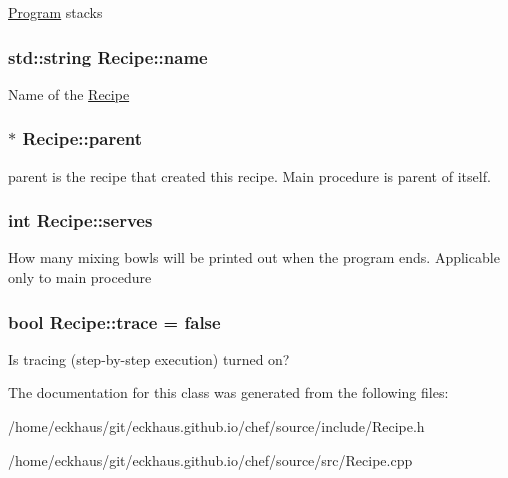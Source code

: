 \hyperlink{classProgram}{Program} stacks \hypertarget{classRecipe_a50091cc91548be3bf3399bd0471667f1}{
\subsubsection[{name}]{\setlength{\rightskip}{0pt plus 5cm}std\-::string Recipe\-::name}}\label{classRecipe_a50091cc91548be3bf3399bd0471667f1}
Name of the \hyperlink{classRecipe}{Recipe} \hypertarget{classRecipe_aa0ee8a8dbfef781def252e579bfbc209}{
\subsubsection[{parent}]{$\ast$ Recipe\-::parent}}\label{classRecipe_aa0ee8a8dbfef781def252e579bfbc209}
parent is the recipe that created this recipe. Main procedure is parent of itself. \hypertarget{classRecipe_a265d7fcca7983c4900e76eb10959c9c2}{
\subsubsection[{serves}]{\setlength{\rightskip}{0pt plus 5cm}int Recipe\-::serves}}\label{classRecipe_a265d7fcca7983c4900e76eb10959c9c2}
How many mixing bowls will be printed out when the program ends. Applicable only to main procedure \hypertarget{classRecipe_a88d8c79248361e1c53b8ab3a1b91238c}{
\subsubsection[{trace}]{\setlength{\rightskip}{0pt plus 5cm}bool Recipe\-::trace = false}}\label{classRecipe_a88d8c79248361e1c53b8ab3a1b91238c}
Is tracing (step-\/by-\/step execution) turned on? 

The documentation for this class was generated from the following files\-:\begin{DoxyCompactItemize}
\item 
/home/eckhaus/git/eckhaus.\-github.\-io/chef/source/include/Recipe.\-h\item 
/home/eckhaus/git/eckhaus.\-github.\-io/chef/source/src/Recipe.\-cpp\end{DoxyCompactItemize}
